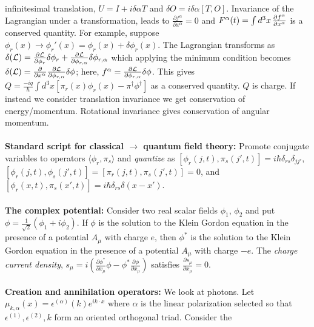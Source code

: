 infinitesimal translation, $U= I+i \delta \alpha T$ and $\delta O= i \delta \alpha [T, O]$.
Invariance of the Lagrangian under a transformation,
leads to 
${\frac {\partial f^{\alpha}}{\partial x^{\alpha}}}=0$ and
$F^{\alpha}(t)= \int d^3 x \thinspace {\frac {\partial f^{\alpha}}{\partial x^{\alpha}}}$ 
is a conserved quantity.
For example, suppose $\phi_r(x) \rightarrow \phi_r'(x)= \phi_r(x)+ \delta \phi_r(x)$.  The Lagrangian transforms
as 
$\delta({\cal L})= {\frac {\partial {\cal L}} {\partial \phi_r}} \delta \phi_r +
{\frac {\partial {\cal L}} {\partial \phi_{r, \alpha}}} \delta \phi_{r, \alpha}$ which applying the
minimum condition becomes
$\delta({\cal L})= {\frac {\partial } {\partial x^{\alpha}}} 
{\frac {\partial {\cal L}} {\partial \phi_{r, \alpha}}} \delta \phi$; here,
$f^{\alpha}= {\frac {\partial {\cal L}} {\partial \phi_{r, \alpha}}} \delta \phi$.
This gives $Q= {\frac {-i q}{\hbar}} \int d^3 x [\pi_r(x)\phi_r(x)-\pi^{\dagger} \phi^{\dagger}]$ as a conserved
quantity.  $Q$ is charge.  If instead we consider translation invariance we get conservation of energy/momentum.
Rotational invariance gives conservation of angular momentum.
\\
\\
{\bf Standard script for classical $\rightarrow$ quantum field theory:}
Promote conjugate variables to operators $\langle \phi_r, \pi_s \rangle$ and \emph{quantize} as
$[\phi_r(j,t), \pi_s(j',t)]= i \hbar \delta_{rs} \delta_{jj'}$,
$[\phi_r(j,t), \phi_s(j',t)]= [\pi_r(j,t), \pi_s(j',t)]= 0$, and
$[\phi_r(x,t), \pi_s(x',t)]= i \hbar \delta_{rs} \delta(x-x')$.
\\
\\
{\bf The complex potential:}  Consider two real scalar fields 
$\phi_1$, 
$\phi_2$ and put
$\phi = {\frac 1 {\sqrt 2}} (\phi_1 + i \phi_2)$.  If 
$\phi$ is the solution to the Klein Gordon
equation in the presence of a potential $A_{\mu}$ with charge $e$, then
$\phi^*$ is the solution to the Klein Gordon
equation in the presence of a potential $A_{\mu}$ with charge $-e$.
The \emph{charge current density}, $s_{\mu}= i(
{\frac {\partial \phi^*} {\partial {x_{\mu}}}} \phi -
\phi^*{\frac {\partial \phi} {\partial {x_{\mu}}}})$ 
satisfies ${\frac {\partial s_{\mu}} {\partial x_{\mu}}}= 0$.
\\
\\
{\bf Creation and annihilation operators:}  We look at photons.
Let $\mu_{k, \alpha}(x)= \epsilon^{(\alpha)}(k) e^{i k \cdot x}$ where $\alpha$ is the linear polarization
selected so that $ \epsilon^{(1)}, \epsilon^{(2)}, k $ form an oriented orthogonal triad.  Consider the
